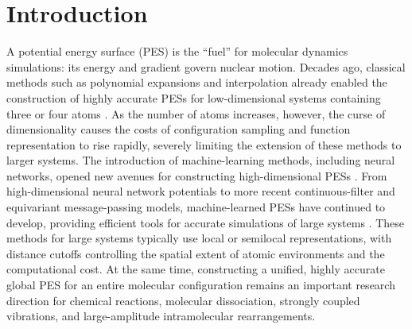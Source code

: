 \section{Introduction}\label{sec:introduction}

A potential energy surface (PES) is the ``fuel'' for molecular dynamics simulations: its energy and gradient govern nuclear motion.
Decades ago, classical methods such as polynomial expansions and interpolation already enabled the construction of highly accurate PESs for low-dimensional systems containing three or four atoms \cite{Murrell1984PotentialEnergy,Ho1996RKHS}.
As the number of atoms increases, however, the curse of dimensionality causes the costs of configuration sampling and function representation to rise rapidly, severely limiting the extension of these methods to larger systems.
The introduction of machine-learning methods, including neural networks, opened new avenues for constructing high-dimensional PESs \cite{Sumpter1992NeuralPES,Blank1995NeuralPES}.
From high-dimensional neural network potentials to more recent continuous-filter and equivariant message-passing models, machine-learned PESs have continued to develop, providing efficient tools for accurate simulations of large systems \cite{Behler2007HDNNP,Schutt2018SchNet,Batzner2022NequIP,Batatia2022MACE}.
These methods for large systems typically use local or semilocal representations, with distance cutoffs controlling the spatial extent of atomic environments and the computational cost.
At the same time, constructing a unified, highly accurate global PES for an entire molecular configuration remains an important research direction for chemical reactions, molecular dissociation, strongly coupled vibrations, and large-amplitude intramolecular rearrangements.

